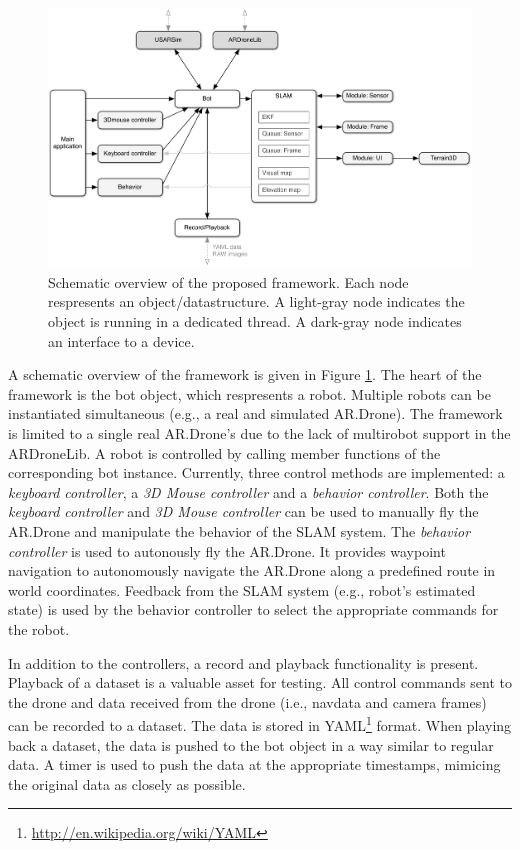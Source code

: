 \begin{figure}[htb!]
\centering
\includegraphics[width=\linewidth]{images/framework.pdf}
\caption{Schematic overview of the proposed framework. Each node respresents an object/datastructure. A light-gray node indicates the object is running in a dedicated thread. A dark-gray node indicates an interface to a device.} 
\label{fig:proposed_framework_schematic}
\end{figure}

A schematic overview of the framework is given in Figure \ref{fig:proposed_framework_schematic}.
The heart of the framework is the bot object, which respresents a robot.
Multiple robots can be instantiated simultaneous (e.g., a real and simulated AR.Drone).
The framework is limited to a single real AR.Drone's due to the lack of multirobot support in the ARDroneLib.
A robot is controlled by calling member functions of the corresponding bot instance.
Currently, three control methods are implemented: a \textit{keyboard controller}, a \textit{3D Mouse controller} and a \textit{behavior controller}.
Both the \textit{keyboard controller} and \textit{3D Mouse controller} can be used to manually fly the AR.Drone and manipulate the behavior of the SLAM system.
The \textit{behavior controller} is used to autonously fly the AR.Drone. 
It provides waypoint navigation to autonomously navigate the AR.Drone along a predefined route in world coordinates.
Feedback from the SLAM system (e.g., robot's estimated state) is used by the behavior controller to select the appropriate commands for the robot.

In addition to the controllers, a record and playback functionality is present.
Playback of a dataset is a valuable asset for testing.
All control commands sent to the drone and data received from the drone (i.e., navdata and camera frames) can be recorded to a dataset.
The data is stored in YAML\footnote{\url{http://en.wikipedia.org/wiki/YAML}} format.
When playing back a dataset, the data is pushed to the bot object in a way similar to regular data.
A timer is used to push the data at the appropriate timestamps, mimicing the original data as closely as possible.

